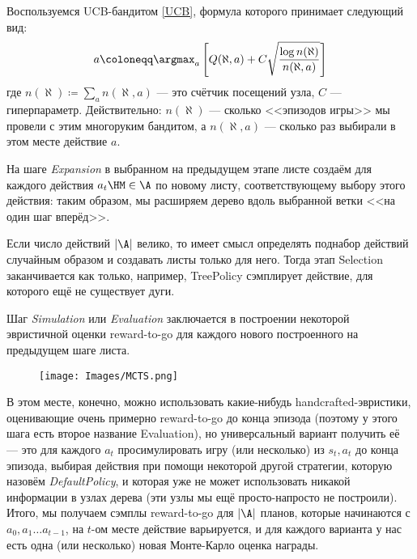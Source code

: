 \begin{example} Воспользуемся UCB-бандитом \eqref{UCB}, формула которого принимает следующий вид:
$$a \coloneqq \argmax_a \left[ Q(\aleph, a) + C \sqrt{\frac{\log n(\aleph)}{n(\aleph, a)}}\right]$$
где $n(\aleph) \coloneqq \sum\limits_a n(\aleph, a)$ --- это счётчик посещений узла, $C$ --- гиперпараметр. Действительно: $n(\aleph)$ --- сколько <<эпизодов игры>> мы провели с этим многоруким бандитом, а $n(\aleph, a)$ --- сколько раз выбирали в этом месте действие $a$. 
\end{example}

\begin{definition}
    На шаге \emph{Expansion} в выбранном на предыдущем этапе листе создаём для каждого действия $a_t \HM\in \A$ по новому листу, соответствующему выбору этого действия: таким образом, мы расширяем дерево вдоль выбранной ветки <<на один шаг вперёд>>.
\end{definition}

\begin{remark}
Если число действий $|\A|$ велико, то имеет смысл определять поднабор действий случайным образом и создавать листы только для него. Тогда этап Selection заканчивается как только, например, TreePolicy сэмплирует действие, для которого ещё не существует дуги.
\end{remark}

\begin{definition}
    Шаг \emph{Simulation} или \emph{Evaluation} заключается в построении некоторой эвристичной оценки reward-to-go для каждого нового построенного на предыдущем шаге листа.
\end{definition}

\begin{wrapfigure}{r}{0.5\textwidth}
\vspace{-0.3cm}
\centering
\texttt{[image: Images/MCTS.png]}
\vspace{-0.3cm}
\end{wrapfigure}

В этом месте, конечно, можно использовать какие-нибудь handcrafted-эвристики, оценивающие очень примерно reward-to-go до конца эпизода (поэтому у этого шага есть второе название Evaluation), но универсальный вариант получить её --- это для каждого $a_t$ просимулировать игру (или несколько) из $s_t, a_t$ до конца эпизода, выбирая действия при помощи некоторой другой стратегии, которую назовём \emph{DefaultPolicy}, и которая уже не может использовать никакой информации в узлах дерева (эти узлы мы ещё просто-напросто не построили). Итого, мы получаем сэмплы reward-to-go для $|\A|$ планов, которые начинаются с $a_0, a_1 \dots a_{t-1}$, на $t$-ом месте действие варьируется, и для каждого варианта у нас есть одна (или несколько) новая Монте-Карло оценка награды.

